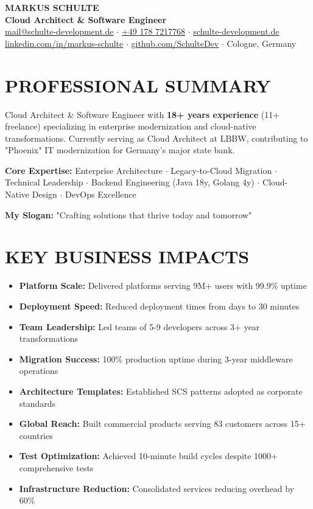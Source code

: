 \documentclass[10pt,a4paper]{article}
\newenvironment{compactlist}{\begin{itemize}[leftmargin=1em,itemsep=0pt,parsep=0pt,topsep=0pt,partopsep=0pt]}{\end{itemize}}
\begin{document}
{\centering
\textbf{\Large\color{primarycolor}MARKUS SCHULTE}\\[0.2em]
\textbf{\large Cloud Architect \& Software Engineer}\\[0.3em]
\small
\href{mailto:mail@schulte-development.de}{mail@schulte-development.de} $\cdot$ 
\href{tel:+4917872177768}{+49 178 7217768} $\cdot$ 
\href{https://schulte-development.de}{schulte-development.de}\\
\href{https://linkedin.com/in/markus-schulte}{linkedin.com/in/markus-schulte} $\cdot$ 
\href{https://github.com/SchulteDev}{github.com/SchulteDev} $\cdot$ 
Cologne, Germany
\par}

\vspace{0.4em}

\section{PROFESSIONAL SUMMARY}

Cloud Architect \& Software Engineer with \textbf{18+ years experience} (11+ freelance) specializing in enterprise modernization and cloud-native transformations. Currently serving as Cloud Architect at LBBW, contributing to "Phoenix" IT modernization for Germany's major state bank.

\textbf{Core Expertise:} Enterprise Architecture $\cdot$ Legacy-to-Cloud Migration $\cdot$ Technical Leadership $\cdot$ Backend Engineering (Java 18y, Golang 4y) $\cdot$ Cloud-Native Design $\cdot$ DevOps Excellence

\textbf{My Slogan:} "Crafting solutions that thrive today and tomorrow"

\section{KEY BUSINESS IMPACTS}

\begin{compactlist}
\item \textbf{Platform Scale:} Delivered platforms serving 9M+ users with 99.9\% uptime
\item \textbf{Deployment Speed:} Reduced deployment times from days to 30 minutes
\item \textbf{Team Leadership:} Led teams of 5-9 developers across 3+ year transformations
\item \textbf{Migration Success:} 100\% production uptime during 3-year middleware operations
\item \textbf{Architecture Templates:} Established SCS patterns adopted as corporate standards
\item \textbf{Global Reach:} Built commercial products serving 83 customers across 15+ countries
\item \textbf{Test Optimization:} Achieved 10-minute build cycles despite 1000+ comprehensive tests
\item \textbf{Infrastructure Reduction:} Consolidated services reducing overhead by 60\%
\end{compactlist}
\end{document}
